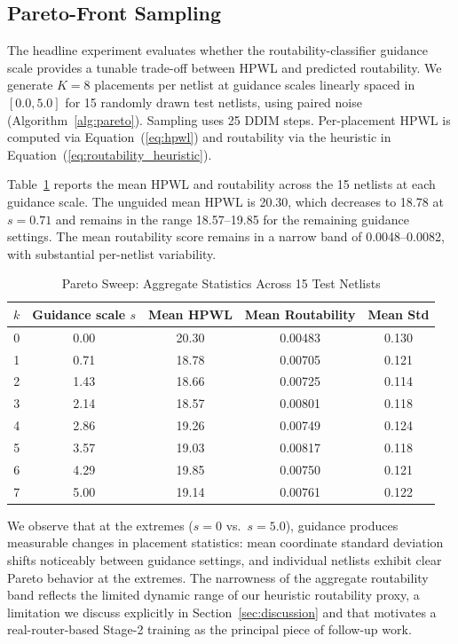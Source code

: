 \documentclass[lettersize,journal]{IEEEtran}
\begin{document}
\subsection{Pareto-Front Sampling}
\label{ssec:pareto_sweep}

The headline experiment evaluates whether the routability-classifier guidance scale provides a tunable trade-off between HPWL and predicted routability. We generate $K = 8$ placements per netlist at guidance scales linearly spaced in $[0.0, 5.0]$ for 15 randomly drawn test netlists, using paired noise (Algorithm~\ref{alg:pareto}). Sampling uses 25 DDIM steps. Per-placement HPWL is computed via Equation~(\ref{eq:hpwl}) and routability via the heuristic in Equation~(\ref{eq:routability_heuristic}).

Table~\ref{tab:aggregate_pareto} reports the mean HPWL and routability across the 15 netlists at each guidance scale. The unguided mean HPWL is 20.30, which decreases to 18.78 at $s = 0.71$ and remains in the range 18.57--19.85 for the remaining guidance settings. The mean routability score remains in a narrow band of 0.0048--0.0082, with substantial per-netlist variability.

\begin{table}[!t]
\caption{Pareto Sweep: Aggregate Statistics Across 15 Test Netlists\label{tab:aggregate_pareto}}
\centering
\begin{tabular}{|c|c|c|c|c|}
\hline
$k$ & Guidance scale $s$ & Mean HPWL & Mean Routability & Mean Std \\
\hline
0 & 0.00 & 20.30 & 0.00483 & 0.130 \\
\hline
1 & 0.71 & 18.78 & 0.00705 & 0.121 \\
\hline
2 & 1.43 & 18.66 & 0.00725 & 0.114 \\
\hline
3 & 2.14 & 18.57 & 0.00801 & 0.118 \\
\hline
4 & 2.86 & 19.26 & 0.00749 & 0.124 \\
\hline
5 & 3.57 & 19.03 & 0.00817 & 0.118 \\
\hline
6 & 4.29 & 19.85 & 0.00750 & 0.121 \\
\hline
7 & 5.00 & 19.14 & 0.00761 & 0.122 \\
\hline
\end{tabular}
\end{table}

We observe that at the extremes ($s = 0$ vs.\ $s = 5.0$), guidance produces measurable changes in placement statistics: mean coordinate standard deviation shifts noticeably between guidance settings, and individual netlists exhibit clear Pareto behavior at the extremes. The narrowness of the aggregate routability band reflects the limited dynamic range of our heuristic routability proxy, a limitation we discuss explicitly in Section~\ref{sec:discussion} and that motivates a real-router-based Stage-2 training as the principal piece of follow-up work.
\end{document}
